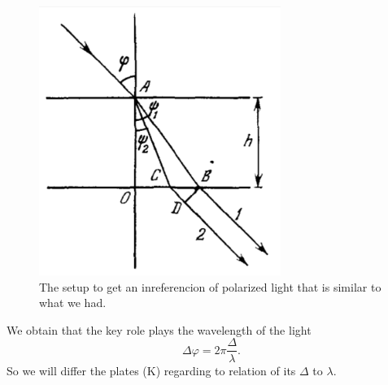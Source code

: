 \begin{minipage}{0.55\textwidth}
    \begin{figure}[h]
    \centering
    \includegraphics[width=0.7\textwidth]{images/intercolor.png}
    \caption{The setup to get an inreferencion of polarized light that is similar to what we had.}
\end{figure}
\end{minipage}
\hfill
\begin{minipage}{0.35\textwidth}
    We obtain that the key role plays the wavelength of the light
    \begin{equation*}
        \Delta \varphi = 2 \pi \frac{\Delta}{\lambda}.
    \end{equation*}
    So we will differ the plates (K) regarding to relation of its $\Delta$ to $\lambda$.
\end{minipage}
